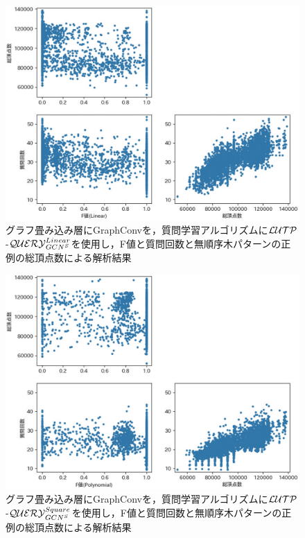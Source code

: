 \begin{figure}[tb]
  \centering
  \includegraphics[scale=0.66]{fig/fig-GraphConv_ln_ql_f1_nodes.eps}
  \caption{グラフ畳み込み層にGraphConvを，質問学習アルゴリズムに${\cal LUTP}$-${\cal QUERY}_{GCN^S}^{Linear}$を使用し，F値と質問回数と無順序木パターンの正例の総頂点数による解析結果}\label{fig:GraphConv_ln_ql_f1_nodes}
\end{figure}

\begin{figure}[tb]
  \centering
  \includegraphics[scale=0.66]{fig/fig-GraphConv_sqr_ql_f1_nodes.eps}
  \caption{グラフ畳み込み層にGraphConvを，質問学習アルゴリズムに${\cal LUTP}$-${\cal QUERY}_{GCN^S}^{Square}$を使用し，F値と質問回数と無順序木パターンの正例の総頂点数による解析結果}\label{fig:GraphConv_sqr_ql_f1_nodes}
\end{figure}

